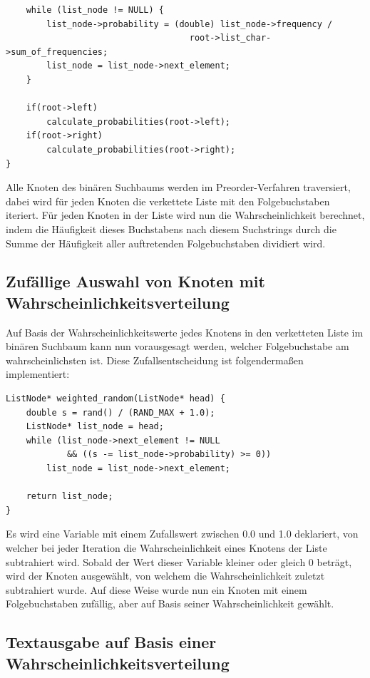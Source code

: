 \documentclass[10pt,a4paper]{article}
\begin{document}
\begin{spacing}{1}
\begin{lstlisting}
    while (list_node != NULL) {
        list_node->probability = (double) list_node->frequency /
                                    root->list_char->sum_of_frequencies;
        list_node = list_node->next_element;
    }

    if(root->left)
        calculate_probabilities(root->left);
    if(root->right)
        calculate_probabilities(root->right);
}
\end{lstlisting}

Alle Knoten des binären Suchbaums werden im Preorder-Verfahren traversiert,
dabei wird für jeden Knoten die verkettete Liste mit den Folgebuchstaben
iteriert. Für jeden Knoten in der Liste wird nun die Wahrscheinlichkeit
berechnet, indem die Häufigkeit dieses Buchstabens nach diesem Suchstrings durch
die Summe der Häufigkeit aller auftretenden Folgebuchstaben dividiert wird.

\subsection{Zufällige Auswahl von Knoten mit Wahrscheinlichkeitsverteilung}

Auf Basis der Wahrscheinlichkeitswerte jedes Knotens in den verketteten Liste 
im binären Suchbaum kann nun vorausgesagt werden, welcher Folgebuchstabe am
wahrscheinlichsten ist. Diese Zufallsentscheidung ist folgendermaßen
implementiert:
\begin{lstlisting}
ListNode* weighted_random(ListNode* head) {
    double s = rand() / (RAND_MAX + 1.0);
    ListNode* list_node = head;
    while (list_node->next_element != NULL
            && ((s -= list_node->probability) >= 0))
        list_node = list_node->next_element;

    return list_node;
}
\end{lstlisting}
Es wird eine Variable mit einem Zufallswert zwischen 0.0 und 1.0 deklariert,
von welcher bei jeder Iteration die Wahrscheinlichkeit eines Knotens der Liste
subtrahiert wird. Sobald der Wert dieser Variable kleiner oder gleich 0 beträgt,
wird der Knoten ausgewählt, von welchem die Wahrscheinlichkeit zuletzt
subtrahiert wurde. Auf diese Weise wurde nun ein Knoten mit einem Folgebuchstaben
 zufällig, aber auf Basis seiner Wahrscheinlichkeit gewählt.

\pagebreak

\subsection{Textausgabe auf Basis einer Wahrscheinlichkeitsverteilung}


\end{spacing}
\end{document}
